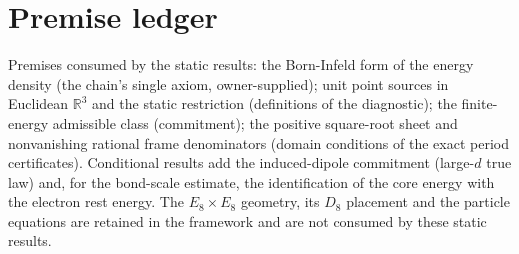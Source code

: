 \documentclass[aps,prd,onecolumn,amsmath,amssymb,longbibliography,floatfix,nofootinbib]{revtex4-2}
\begin{document}
\section{Premise ledger}
Premises consumed by the static results: the Born-Infeld form of the energy density (the chain's single axiom, owner-supplied); unit point sources in Euclidean $\mathbb{R}^3$ and the static restriction (definitions of the diagnostic); the finite-energy admissible class (commitment); the positive square-root sheet and nonvanishing rational frame denominators (domain conditions of the exact period certificates). Conditional results add the induced-dipole commitment (large-$d$ true law) and, for the bond-scale estimate, the identification of the core energy with the electron rest energy. The $E_8\times E_8$ geometry, its $D_8$ placement and the particle equations are retained in the framework and are not consumed by these static results.


\end{document}
